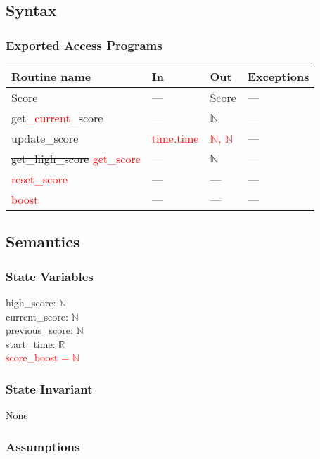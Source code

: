 \documentclass[12pt]{article}
\begin{document}
\subsection* {Syntax}

\subsubsection* {Exported Access Programs}

\begin{tabular}{| l | l | l | l |}
\hline
\textbf{Routine name} & \textbf{In} & \textbf{Out} & \textbf{Exceptions}\\
\hline
    Score &--- & Score& ---\\
\hline 
    get\textcolor{red}{\_current}\_score & --- & $\mathbb{N}$ & --- \\
\hline
    update\_score & \textcolor{red}{time.time} & \textcolor{red}{$\mathbb{N}$, $\mathbb{N}$} & ---\\
\hline
    \sout{get\_high\_score} \textcolor{red}{get\_score} & --- & $\mathbb{N}$ & --- \\
\hline
    \textcolor{red}{reset\_score} & --- & --- & --- \\
\hline
    \textcolor{red}{boost} & --- & --- & --- \\
\hline
\end{tabular}

\subsection* {Semantics}

\subsubsection* {State Variables}

high\_score: $\mathbb{N}$ \\
current\_score: $\mathbb{N}$ \\
previous\_score: $\mathbb{N}$ \\
\sout{start\_time: $\mathbb{R}$} \\
\textcolor{red}{score\_boost = $\mathbb{N}$}

\subsubsection* {State Invariant}

None

\subsubsection* {Assumptions}
\end{document}
